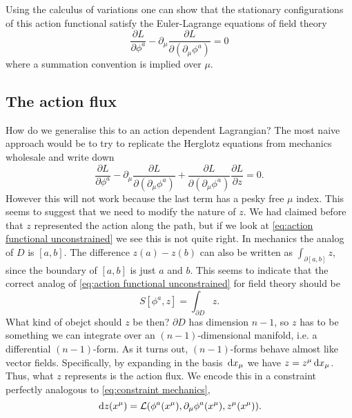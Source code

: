 \documentclass[../main.tex]{subfiles}
\begin{document}
Using the calculus of variations one can show that the stationary configurations of this
action functional satisfy the Euler-Lagrange equations of field theory
\begin{equation*}
	\frac{\partial L}{\partial \phi^a} - \partial_\mu \frac{\partial L}{\partial
	(\partial_\mu \phi ^a)} = 0
\end{equation*}
where a summation convention is implied over \( \mu \). 

\subsection{The action flux}
How do we generalise this to an action dependent Lagrangian? The most naive approach would
be to try to replicate the Herglotz equations from mechanics wholesale and write down
\begin{equation*}
	\frac{\partial L}{\partial \phi^a} - \partial_\mu \frac{\partial L}{\partial
	(\partial_\mu \phi ^a)} + \frac{\partial L}{\partial(\partial_\mu \phi^a)}\frac{\partial
L}{\partial z} = 0. 
\end{equation*}
However this will not work because the last term has a pesky free \( \mu \) index. This
seems to suggest that we need to modify the nature of \( z \). We had claimed before that
\( z \) represented the action along the path, but if we look at \cref{eq:action
functional unconstrained} we see this is not quite right. In mechanics the analog of \( D
\) is \( [a,b] \). The difference \( z(a) - z(b) \) can also be written as \(
\int_{\partial [a,b]} z \), since the boundary of \( [a,b] \) is just \( a \) and \( b \).
This seems to indicate that the correct analog of \cref{eq:action functional
unconstrained} for field theory should be
\begin{equation*}
	S[\phi^a, z] = \int_{\partial D} z.
\end{equation*}
What kind of obejct should \( z \) be then? \( \partial D \) has dimension \( n-1 \), so
\( z \) has to be something we can integrate over an \( (n-1) \)-dimensional manifold,
i.e. a differential \( (n-1) \)-form. As it turns out, \( (n-1) \)-forms behave almost
like vector fields. Specifically, by expanding in the basis \( \,\mathrm{d} x_\mu \) we have \( z =
z^\mu \,\mathrm{d} x_\mu \). Thus, what \( z \) represents is the action flux. We encode this in a
constraint perfectly analogous to \cref{eq:constraint mechanics},
\begin{equation} \label{eq:constraint field theory}
	\,\mathrm{d} z(x^\mu) = \mathcal{L}(\phi^a(x^\mu), \partial_\mu \phi^a(x^\mu), z^\mu(x^\mu)).
\end{equation}
\end{document}

